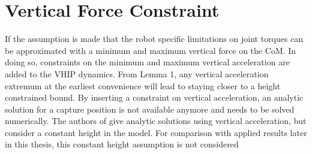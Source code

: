 \section{Vertical Force Constraint}\label{sec:verticalforce}
If the assumption is made that the robot specific limitations on joint torques can be approximated with a minimum and maximum vertical force on the CoM. In doing so, constraints on the minimum and maximum vertical acceleration are added to the \ac{VHIP} dynamics. From Lemma 1, any vertical acceleration extremum at the earliest convenience will lead to staying closer to a height constrained bound. By inserting a constraint on vertical acceleration, an analytic solution for a capture position is not available anymore and needs to be solved numerically. The authors of \cite{gao2017increase} give analytic solutions using vertical acceleration, but consider a constant height in the model. For comparison with applied results later in this thesis, this constant height assumption is not considered
     
